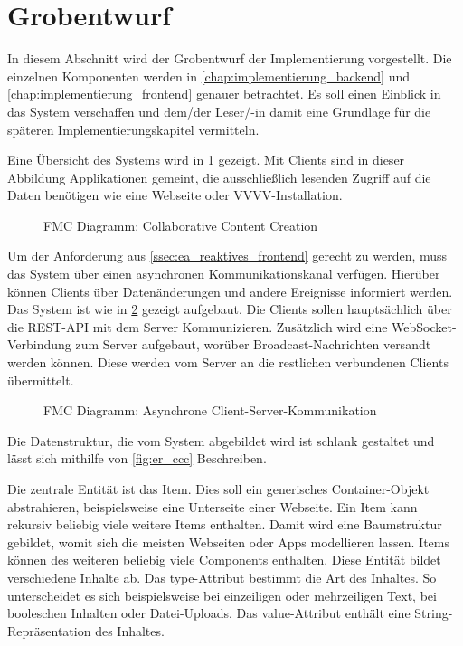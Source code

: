 \section{Grobentwurf}
\label{sec:k_grobentwurf}

In diesem Abschnitt wird der Grobentwurf der Implementierung vorgestellt.  Die
einzelnen Komponenten werden in \cref{chap:implementierung_backend} und
\ref{chap:implementierung_frontend} genauer betrachtet.  Es soll einen Einblick
in das System verschaffen und dem/der Leser/-in damit eine Grundlage für die
späteren Implementierungskapitel vermitteln.

Eine Übersicht des Systems wird in \cref{fig:fmc_ccc} gezeigt.  Mit Clients sind
in dieser Abbildung Applikationen gemeint, die ausschließlich lesenden Zugriff
auf die Daten benötigen wie eine Webseite oder VVVV-Installation.

\begin{figure}
    \centering
    
    \caption{FMC Diagramm: Collaborative Content Creation}
    \label{fig:fmc_ccc}
\end{figure}

Um der Anforderung aus \cref{ssec:ea_reaktives_frontend} gerecht zu werden, muss
das System über einen asynchronen Kommunikationskanal verfügen.  Hierüber können
Clients über Datenänderungen und andere Ereignisse informiert werden.  Das
System ist wie in \cref{fig:fmc_async_client_server} gezeigt aufgebaut.  Die
Clients sollen hauptsächlich über die REST-API mit dem Server Kommunizieren.
Zusätzlich wird eine WebSocket-Verbindung zum Server aufgebaut, worüber
Broadcast-Nachrichten versandt werden können.  Diese werden vom Server an die
restlichen verbundenen Clients übermittelt.

\begin{figure}
    \centering
    
    \caption{FMC Diagramm: Asynchrone Client-Server-Kommunikation}
    \label{fig:fmc_async_client_server}
\end{figure}

Die Datenstruktur, die vom System abgebildet wird ist schlank gestaltet und
lässt sich mithilfe von \cref{fig:er_ccc} Beschreiben.

Die zentrale Entität ist das Item.  Dies soll ein generisches Container-Objekt
abstrahieren, beispielsweise eine Unterseite einer Webseite.  Ein Item kann
rekursiv beliebig viele weitere Items enthalten.  Damit wird eine Baumstruktur
gebildet, womit sich die meisten Webseiten oder Apps modellieren lassen.  Items
können des weiteren beliebig viele Components enthalten.  Diese Entität bildet
verschiedene Inhalte ab.  Das type-Attribut bestimmt die Art des Inhaltes. So
unterscheidet es sich beispielsweise bei einzeiligen oder mehrzeiligen Text, bei
booleschen Inhalten oder Datei-Uploads.  Das value-Attribut enthält eine
String-Repräsentation des Inhaltes.

